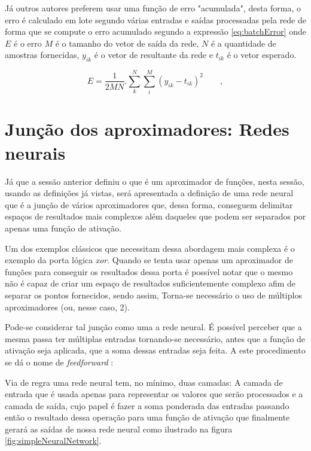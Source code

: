 \begin{apendicesenv}
		
		\par Já outros autores preferem usar uma função de erro "acumulada", desta forma, o erro é calculado em lote segundo várias entradas e saídas processadas pela rede de forma que se compute o erro acumulado segundo a expressão \ref{eq:batchError} onde $E$ é o erro $M$ é o tamanho do vetor de saída da rede, $N$ é a quantidade de amostras fornecidas, $y_{ik}$ é o vetor de resultante da rede e $t_{ik}$ é o vetor esperado.
		
		
		\begin{equation}
			E = \dfrac{1}{2MN} . \sum_{k}^{N}\sum_{i}^{M}(y_{ik}-t_{ik})^2 \qquad,
			\label{eq:batchError}
		\end{equation}
		
	\section{Junção dos aproximadores: Redes neurais }
		\par Já que a sessão anterior definiu o que é um aproximador de funções, nesta sessão, usando as definições já vistas, será apresentada a definição de uma rede neural que é a junção de vários aproximadores que, dessa forma, conseguem  delimitar espaços de resultados mais complexos além daqueles que podem ser separados por apenas uma função de ativação.
		
		\par Um dos exemplos clássicos que necessitam dessa abordagem mais complexa é o exemplo da porta lógica \textit{xor}. Quando se tenta usar apenas um aproximador de funções para conseguir os resultados dessa porta é possível notar que o mesmo não é capaz de criar um espaço de resultados suficientemente complexo afim de separar os pontos fornecidos, sendo assim, Torna-se necessário o uso de múltiplos aproximadores (ou, nesse caso, 2).
		
		\par Pode-se considerar tal junção como uma a rede neural. É possível perceber que a mesma passa ter múltiplas entradas tornando-se necessário, antes que a função de ativação seja aplicada, que a soma dessas entradas seja feita. A este procedimento se dá o nome de \textit{feedforward} \cite{haykinredes}:
		
		\par Via de regra uma rede neural tem, no mínimo, duas camadas: A camada de entrada que é usada apenas para representar os valores que serão processados e a camada de saída, cujo papel é fazer a soma ponderada das entradas passando então o resultado dessa operação para uma função de ativação que finalmente gerará as saídas de nossa rede neural como ilustrado na figura \ref{fig:simpleNeuralNetwork}.
		

\end{apendicesenv}
